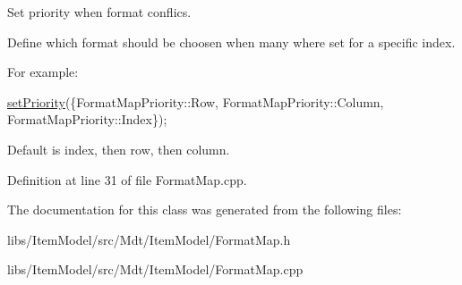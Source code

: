 Set priority when format conflics. 

Define which format should be choosen when many where set for a specific index.

For example\+: 
\begin{DoxyCode}
\hyperlink{class_mdt_1_1_item_model_1_1_format_map_a85f43d8c348e1792f32316850cc90364}{setPriority}(\{FormatMapPriority::Row, FormatMapPriority::Column, FormatMapPriority::Index\});
\end{DoxyCode}


Default is index, then row, then column. 

Definition at line 31 of file Format\+Map.\+cpp.



The documentation for this class was generated from the following files\+:\begin{DoxyCompactItemize}
\item 
libs/\+Item\+Model/src/\+Mdt/\+Item\+Model/Format\+Map.\+h\item 
libs/\+Item\+Model/src/\+Mdt/\+Item\+Model/Format\+Map.\+cpp\end{DoxyCompactItemize}
